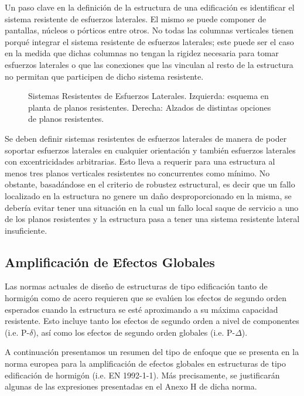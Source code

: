 Un paso clave en la definición de la estructura de una edificación es identificar el sistema resistente de esfuerzos laterales. El mismo se puede componer de pantallas, núcleos o pórticos entre otros. No todas las columnas verticales tienen porqué integrar el sistema resistente de esfuerzos laterales; este puede ser el caso en la medida que dichas columnas no tengan la rigidez necesaria para tomar esfuerzos laterales o que las conexiones que las vinculan al resto de la estructura no permitan que participen de dicho sistema resistente.

\begin{figure}[htb]
  \centering
	\caption{Sistemas Resistentes de Esfuerzos Laterales. Izquierda: esquema en planta de planos resistentes. Derecha: Alzados de distintas opciones de planos resistentes.}
	\label{fig:EsqNucleos}
\end{figure}

Se deben definir sistemas resistentes de esfuerzos laterales de manera de poder soportar esfuerzos laterales en cualquier orientación y también esfuerzos laterales con excentricidades arbitrarias. Esto lleva a requerir para una estructura al menos tres planos verticales resistentes no concurrentes como mínimo. No obstante, basadándose en el criterio de robustez estructural, es decir que un fallo localizado en la estructura no genere un daño desproporcionado en la misma, se debería evitar tener una situación en la cual un fallo local saque de servicio a uno de los planos resistentes y la estructura pasa a tener una sistema resistente lateral insuficiente.


\subsection{Amplificación de Efectos Globales}

Las normas actuales de diseño de estructuras de tipo edificación tanto de hormigón como de acero requieren que se evalúen los efectos de segundo orden esperados cuando la estructura se esté aproximando a su máxima capacidad resistente. Esto incluye tanto los efectos de segundo orden a nivel de componentes (i.e. P-$\delta$), así como los efectos de segundo orden globales (i.e. P-$\Delta$).

A continuación presentamos un resumen del tipo de enfoque que se presenta en la norma europea para la amplificación de efectos globales en estructuras de tipo edificación de hormigón (i.e. EN 1992-1-1). Más precisamente, se justificarán algunas de las expresiones presentadas en el Anexo H de dicha norma.

